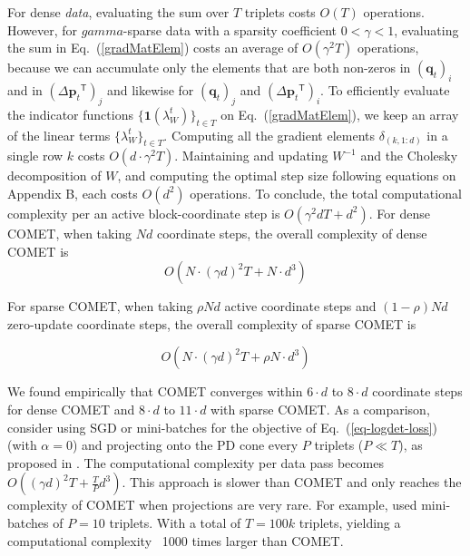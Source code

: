 \documentclass[twoside,11pt]{article}
\newcommand\mat[1]{{#1}}
\renewcommand\vec[1]{\mathbf{#1}}
\newcommand{\T}{{}^\mathsf{T}}
\newcommand{\W}{\mat{W}}
\renewcommand{\eqref}[1]{Eq.~(\ref{#1})}
\begin{document}
For dense \emph{data}, evaluating the sum over $T$ triplets costs $O(T)$ operations. However, for $gamma$-sparse data with a sparsity coefficient $ 0< \gamma <1 $, evaluating the sum in \eqref{gradMatElem} costs an average of $O(\gamma^2 T)$ operations, because we can accumulate only the elements that are both non-zeros in $(\vec{q}_{t})_i$ and in $(\Delta\vec{p}_{t}\T)_j  $ and likewise for $(\vec{q}_{t})_j$ and $(\Delta\vec{p}_{t}\T)_i$.   To efficiently evaluate the indicator functions $\{ \textbf{1}(\lambda_{W}^t) \}_{t \in T}$ on \eqref{gradMatElem}, we keep an array of the linear terms $\{\lambda_{W}^t\}_{t \in T}$. Computing all the gradient elements $\delta_{(k,1:d)}$ in a single row $k$ costs $O(d\cdot \gamma^2 T)$.
Maintaining and updating $\W^{-1}$ and the Cholesky decomposition of $\W$, and computing the optimal step size following equations on Appendix B, each costs $O(d^2)$ operations. 
To conclude, the total computational complexity per an active block-coordinate step is $O(\gamma^2 d T + d^2)$. 
For dense COMET, when taking $Nd$ coordinate steps, the overall complexity of dense COMET is 
\begin{equation}
O(N \cdot (\gamma d)^2 T + N \cdot d^3)
\label{cometComplexity}
\end{equation}

For sparse COMET, when taking $\rho N d$ active coordinate steps and $(1-\rho) Nd$ zero-update coordinate steps, the overall complexity of sparse COMET is

\begin{equation}
O(N \cdot (\gamma d)^2 T + \rho N \cdot d^3)
\label{spcometComplexity}
\end{equation}

We found empirically that COMET converges within $6 \cdot d$ to $8 \cdot d$ coordinate steps for dense COMET and $8 \cdot d$ to $11 \cdot d$ with sparse COMET. As a comparison, consider using SGD or mini-batches for the objective of \eqref{eq-logdet-loss} (with $
\alpha = 0$) and projecting onto the PD cone every $P$ triplets ($P \ll T$), as proposed in \citep{OASIS,qian}. The computational complexity per data pass becomes $O((\gamma d)^2 T + \frac{T}{P} d^3)$. This approach is slower than COMET and only reaches the complexity of COMET when projections are very rare. For example, \citet{qian} used mini-batches of $P=10$ triplets. With a total of $T=100k$ triplets, yielding a computational complexity ~1000 times larger than COMET.
\end{document}
